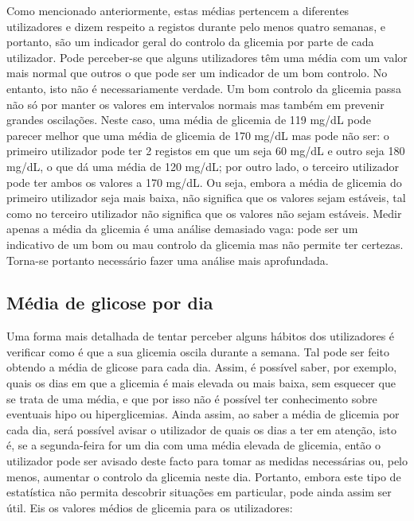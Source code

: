 Como mencionado anteriormente, estas médias pertencem a diferentes utilizadores e dizem respeito a registos durante pelo menos quatro semanas, e portanto, são um indicador geral do controlo da glicemia por parte de cada utilizador. Pode perceber-se que alguns utilizadores têm uma média com um valor mais normal que outros o que pode ser um indicador de um bom controlo. No entanto, isto não é necessariamente verdade. Um bom controlo da glicemia passa não só por manter os valores em intervalos normais mas também em prevenir grandes oscilações. Neste caso, uma média de glicemia de 119 mg/dL pode parecer melhor que uma média de glicemia de 170 mg/dL mas pode não ser: o primeiro utilizador pode ter 2 registos em que um seja 60 mg/dL e outro seja 180 mg/dL, o que dá uma média de 120 mg/dL; por outro lado, o terceiro utilizador pode ter ambos os valores a 170 mg/dL. Ou seja, embora a média de glicemia do primeiro utilizador seja mais baixa, não significa que os valores sejam estáveis, tal como no terceiro utilizador não significa que os valores não sejam estáveis. Medir apenas a média da glicemia é uma análise demasiado vaga: pode ser um indicativo de um bom ou mau controlo da glicemia mas não permite ter certezas. Torna-se portanto necessário fazer uma análise mais aprofundada.



\subsection{Média de glicose por dia}

Uma forma mais detalhada de tentar perceber alguns hábitos dos utilizadores é verificar como é que a sua glicemia oscila durante a semana. Tal pode ser feito obtendo a média de glicose para cada dia. Assim, é possível saber, por exemplo, quais os dias em que a glicemia é mais elevada ou mais baixa, sem esquecer que se trata de uma média, e que por isso não é possível ter conhecimento sobre eventuais hipo ou hiperglicemias. Ainda assim, ao saber a média de glicemia por cada dia, será possível avisar o utilizador de quais os dias a ter em atenção, isto é, se a segunda-feira for um dia com uma média elevada de glicemia, então o utilizador pode ser avisado deste facto para tomar as medidas necessárias ou, pelo menos, aumentar o controlo da glicemia neste dia. Portanto, embora este tipo de estatística não permita descobrir situações em particular, pode ainda assim ser útil. Eis os valores médios de glicemia para os utilizadores:\newline


